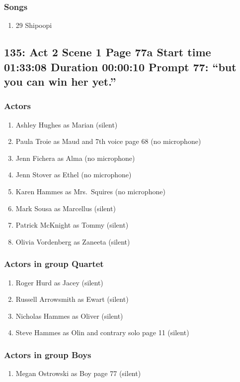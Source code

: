 \subsubsection{Songs}
\begin{enumerate}
\item 29 Shipoopi
\end{enumerate}
\subsection{135: Act 2 Scene 1 Page 77a Start time 01:33:08 Duration 00:00:10 Prompt 77: ``but you can win her yet.''}

\subsubsection{Actors}
\begin{enumerate}
\item Ashley Hughes as Marian (silent)
\item Paula Troie as Maud and 7th voice page 68 (no microphone)
\item Jenn Fichera as Alma (no microphone)
\item Jenn Stover as Ethel (no microphone)
\item Karen Hammes as Mrs.~Squires (no microphone)
\item Mark Sousa as Marcellus (silent)
\item Patrick McKnight as Tommy (silent)
\item Olivia Vordenberg as Zaneeta (silent)
\end{enumerate}
\subsubsection{Actors in group Quartet}
\begin{enumerate}
\item Roger Hurd as Jacey (silent)
\item Russell Arrowsmith as Ewart (silent)
\item Nicholas Hammes as Oliver (silent)
\item Steve Hammes as Olin and contrary solo page 11 (silent)
\end{enumerate}
\subsubsection{Actors in group Boys}
\begin{enumerate}
\item Megan Ostrowski as Boy page 77 (silent)
\end{enumerate}


